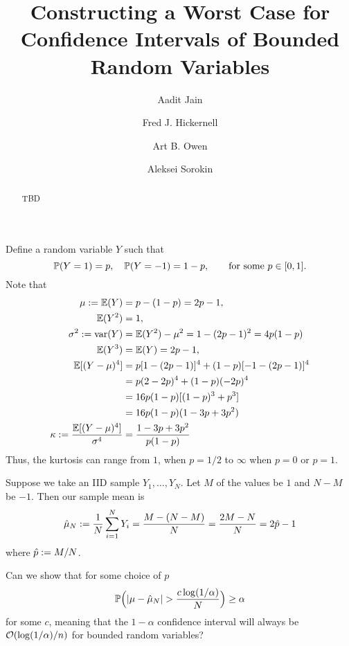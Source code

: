 \documentclass{amsart}
\begin{document}
\title{Constructing a Worst Case for Confidence Intervals of Bounded Random Variables}

\author{Aadit Jain}

\author{Fred J. Hickernell }
\address{Department of Applied Mathematics, Illinois Institute of Technology, Chicago, IL}

\author{Art B. Owen}

\author{Aleksei Sorokin}

\begin{abstract} TBD
\end{abstract}

\maketitle

Define a random variable $Y$ such that 
\begin{equation*}
    \operatorname{\mathbb{P}}(Y = 1) = p, \quad \operatorname{\mathbb{P}}(Y=-1) = 1-p, \qquad \text{for some } p \in [0,1].
\end{equation*}
Note that 
\begin{align*}
    \mu : = \operatorname{\mathbb{E}}(Y) & = p - (1-p) = 2 p - 1, \\
    \operatorname{\mathbb{E}}(Y^2) & = 1, \\
    \sigma^2 : = \operatorname{var}(Y) & = \operatorname{\mathbb{E}}(Y^2) - \mu^2 = 1 - (2p-1)^2 = 4p(1-p)\\
    \operatorname{\mathbb{E}}(Y^3) & = \operatorname{\mathbb{E}}(Y) =  2p -1, \\
    \operatorname{\mathbb{E}}[(Y - \mu)^4] & = p[1-(2p-1)]^4 + (1-p)[-1 - (2p-1)]^4 \\
    & = p(2 - 2p)^4 + (1-p)(-2p)^4 \\
    & = 16p(1-p)[(1-p)^3 + p^3] \\
    & = 16p(1-p)(1 - 3p + 3 p^2) \\
    \kappa : = \frac{\operatorname{\mathbb{E}}[(Y - \mu)^4]}{\sigma^4} & = 
    \frac{1 - 3p + 3 p^2}{p(1-p)}
\end{align*}
Thus, the kurtosis can range from $1$, when $p = 1/2$ to $\infty$ when $p = 0$ or $p=1$.

Suppose we take an IID sample $Y_1, \ldots, Y_N$.  Let $M$ of the values be $1$ and $N-M$ be $-1$.  Then our sample mean is 
\begin{equation*}
    \hat{\mu}_N := \frac 1N \sum_{i=1}^N Y_i 
    = \frac{M - (N- M)}{N} =
    \frac{2M -N}{N} =  2 \hat{p} -1
\end{equation*}
where $\hat{p} : = M/N$.

Can we show that for some choice of $p$
\[
\operatorname{\mathbb{P}}\Bigl(\lvert \mu - \hat{\mu}_N \rvert > \frac{c \log(1/\alpha)}{N} \Bigr) \ge \alpha
\]
for some $c$, meaning that the $1-\alpha$ confidence interval will always be $\operatorname{{\mathcal O}}(\log(1/\alpha)/n)$ for bounded random variables?
\end{document}

